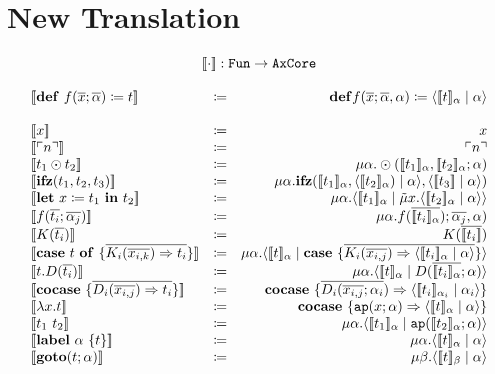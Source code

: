 \documentclass[nonacm]{acmart}
\newcommand{\translate}[1]{\ensuremath{[\![#1]\!]}}
\newcommand{\lit}[1]{\ensuremath{\ulcorner #1\urcorner}}
\newcommand{\cut}[2]{\ensuremath{\langle #1 \mid #2 \rangle}}
\newcommand{\letin}[3]{\ensuremath{\mathbf{let}\ #1 \coloneq #2\ \mathbf{in}\ #3}}
\newcommand{\caseof}[2]{\ensuremath{\mathbf{case}\ #1\ \mathbf{of}\ \{ #2 \}}}
\begin{document}
\section{New Translation}
\[
  \begin{array}{l c r}
    \multicolumn{3}{c}{\translate{\cdot} : \mathtt{Fun}\rightarrow\mathtt{AxCore}}\\
    \\
    \translate{\mathbf{def}\ f(\overline{x};\overline{\alpha}) \coloneq t} & \coloneq & \mathbf{def}f(\overline{x};\overline{\alpha},\alpha) \coloneq \cut{\translate{t}_{\alpha}}{\alpha}\\
    \\
    \translate{x} & \coloneq  & x \\
    \translate{\lit{n}} & \coloneq & \lit{n}\\
    \translate{t_1 \odot t_2} & \coloneq & \mu \alpha. \odot(\translate{t_1}_{\alpha},\translate{t_2}_{\alpha};\alpha)\\
    \translate{\mathbf{ifz}(t_1,t_2,t_3)} & \coloneq & \mu\alpha.\mathbf{ifz}(\translate{t_1}_{\alpha},\cut{\translate{t_2}_{\alpha})}{\alpha},\cut{\translate{t_3}}{\alpha})\\
    \translate{\letin{x}{t_1}{t_2}} & \coloneq & \mu\alpha.\cut{\translate{t_1}_{\alpha}}{\tilde{\mu}x.\cut{\translate{t_2}_{\alpha}}{\alpha}}\\
    \translate{f(\overline{t_i};\overline{\alpha_j})} & \coloneq & \mu\alpha.f(\overline{\translate{t_i}_{\alpha}});\overline{\alpha_j},\alpha)\\
    \translate{K(\overline{t_i})} & \coloneq & K(\overline{\translate{t_i}})\\
    \translate{\caseof{t}{\overline{K_i(\overline{x_{i,k}}) \Rightarrow t_i}}} & \coloneq & \mu\alpha.\cut{\translate{t}_{\alpha}}{\mathbf{case}\ \{\overline{K_i(\overline{x_{i,j}})\Rightarrow \cut{\translate{t_i}_{\alpha}}{\alpha}} \}}\\
    \translate{t.D(\overline{t_i})} & \coloneq & \mu\alpha.\cut{\translate{t}_{\alpha}}{D(\overline{\translate{t_i}_{\alpha}};\alpha)}\\
    \translate{\mathbf{cocase}\ \{\overline{D_i(\overline{x_{i,j}})\Rightarrow t_i}\}} & \coloneq & \mathbf{cocase}\ \{ \overline{D_i(\overline{x_{i,j}};\alpha_i})\Rightarrow \cut{\translate{t_i}_{\alpha_i}}{\alpha_i} \}\\
    \translate{\lambda x.t} & \coloneq & \mathbf{cocase}\ \{\mathtt{ap}(x;\alpha) \Rightarrow \cut{\translate{t}_{\alpha}}{\alpha}\}\\
    \translate{t_1\ t_2} & \coloneq & \mu\alpha.\cut{\translate{t_1}_{\alpha}}{\mathtt{ap}(\translate{t_2}_{\alpha};\alpha)}\\
    \translate{\mathbf{label}\ \alpha\ \{t\}} & \coloneq & \mu\alpha.\cut{\translate{t}_{\alpha}}{\alpha}\\
    \translate{\mathbf{goto}(t;\alpha)} & \coloneq & \mu\beta.\cut{\translate{t}_{\beta}}{\alpha}\\
  \end{array}
\]
\end{document}
